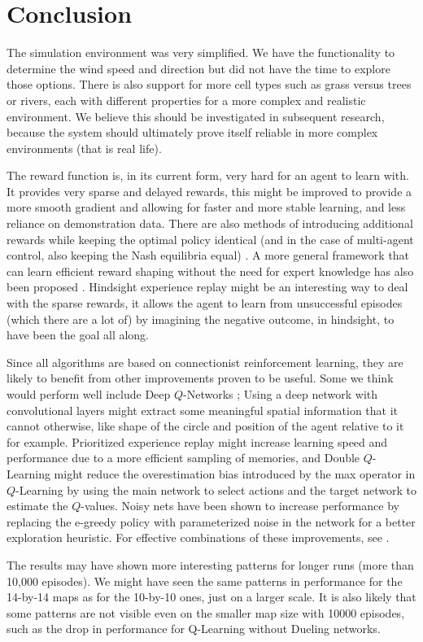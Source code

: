 
\section{Conclusion}\label{sec:conclusions}
The simulation environment was very simplified. We have the functionality to determine the wind speed and direction but did not have the time to explore those options. There is also support for more cell types such as grass versus trees or rivers, each with different properties for a more complex and realistic environment. We believe this should be investigated in subsequent research, because the system should ultimately prove itself reliable in more complex environments (that is real life).

The reward function is, in its current form, very hard for an agent to learn with. It provides very sparse and delayed rewards, this might be improved to provide a more smooth gradient and allowing for faster and more stable learning, and less reliance on demonstration data. There are also methods of introducing additional rewards while keeping the optimal policy identical (and in the case of multi-agent control, also keeping the Nash equilibria equal) \citep{ng1999policy}. A more general framework that can learn efficient reward shaping without the need for expert knowledge has also been proposed \citep{zou2019reward}. Hindsight experience replay \citep{andrychowicz2017hindsight} might be an interesting way to deal with the sparse rewards, it allows the agent to learn from unsuccessful episodes (which there are a lot of) by imagining the negative outcome, in hindsight, to have been the goal all along.

Since all algorithms are based on connectionist reinforcement learning, they are likely to benefit from other improvements proven to be useful. Some we think would perform well include Deep $Q$-Networks \citep{mnih2015human}; Using a deep network with convolutional layers might extract some meaningful spatial information that it cannot otherwise, like shape of the circle and position of the agent relative to it for example. Prioritized experience replay \citep{schaul2015prioritized} might increase learning speed and performance due to a more efficient sampling of memories, and Double $Q$-Learning \citep{hasselt2010double} might reduce the overestimation bias introduced by the max operator in $Q$-Learning by using the main network to select actions and the target network to estimate the $Q$-values. Noisy nets \citep{fortunato2017noisy} have been shown to increase performance by replacing the e-greedy policy with parameterized noise in the network for a better exploration heuristic. For effective combinations of these improvements, see \citep{hessel2018rainbow}.

The results may have shown more interesting patterns for longer runs (more than 10,000 episodes). We might have seen the same patterns in performance for the 14-by-14 maps as for the 10-by-10 ones, just on a larger scale. It is also likely that some patterns are not visible even on the smaller map size with 10000 episodes, such as the drop in performance for Q-Learning without Dueling networks.